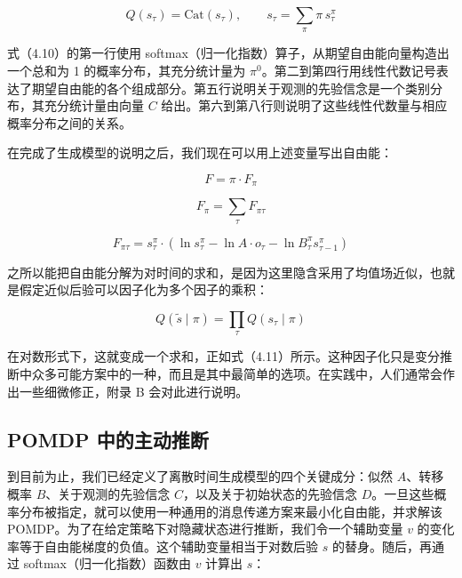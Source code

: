 \begin{equation}
Q(s_\tau) = \mathrm{Cat}(s_\tau), \qquad s_\tau = \sum_\pi \pi\, s^\pi_\tau
\tag{4.10}
\end{equation}

式（4.10）的第一行使用 softmax（归一化指数）算子，从期望自由能向量构造出一个总和为 1 的概率分布，其充分统计量为 $\pi^0$。第二到第四行用线性代数记号表达了期望自由能的各个组成部分。第五行说明关于观测的先验信念是一个类别分布，其充分统计量由向量 $C$ 给出。第六到第八行则说明了这些线性代数量与相应概率分布之间的关系。

在完成了生成模型的说明之后，我们现在可以用上述变量写出自由能：

\begin{equation}
F = \pi \cdot F_\pi
\tag{4.11}
\end{equation}

\begin{equation}
F_\pi = \sum_\tau F_{\pi\tau}
\tag{4.11}
\end{equation}

\begin{equation}
F_{\pi\tau}
= s^\pi_\tau \cdot
\left(
\ln s^\pi_\tau - \ln A \cdot o_\tau - \ln B^\pi_\tau s^\pi_{\tau-1}
\right)
\tag{4.11}
\end{equation}

之所以能把自由能分解为对时间的求和，是因为这里隐含采用了均值场近似，也就是假定近似后验可以因子化为多个因子的乘积：

\begin{equation}
Q(\tilde{s} \mid \pi) = \prod_\tau Q(s_\tau \mid \pi)
\tag{4.12}
\end{equation}

在对数形式下，这就变成一个求和，正如式（4.11）所示。这种因子化只是变分推断中众多可能方案中的一种，而且是其中最简单的选项。在实践中，人们通常会作出一些细微修正，附录 B 会对此进行说明。

\subsection{POMDP 中的主动推断}

到目前为止，我们已经定义了离散时间生成模型的四个关键成分：似然 $A$、转移概率 $B$、关于观测的先验信念 $C$，以及关于初始状态的先验信念 $D$。一旦这些概率分布被指定，就可以使用一种通用的消息传递方案来最小化自由能，并求解该 POMDP。为了在给定策略下对隐藏状态进行推断，我们令一个辅助变量 $v$ 的变化率等于自由能梯度的负值。这个辅助变量相当于对数后验 $s$ 的替身。随后，再通过 softmax（归一化指数）函数由 $v$ 计算出 $s$：

